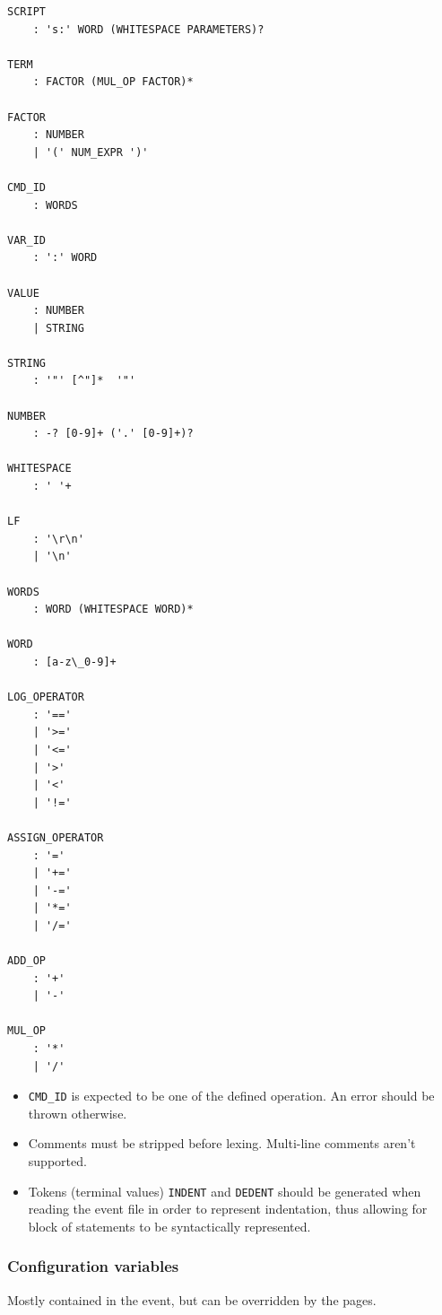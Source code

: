 \documentclass[11pt]{article}
\begin{document}
\newpage
\begin{Verbatim}[frame=single, fontsize=\footnotesize]
SCRIPT
    : 's:' WORD (WHITESPACE PARAMETERS)?

TERM
    : FACTOR (MUL_OP FACTOR)*

FACTOR
    : NUMBER
    | '(' NUM_EXPR ')'

CMD_ID
    : WORDS
    
VAR_ID
    : ':' WORD
    
VALUE
    : NUMBER
    | STRING
    
STRING
    : '"' [^"]*  '"'

NUMBER
    : -? [0-9]+ ('.' [0-9]+)?

WHITESPACE
    : ' '+

LF
    : '\r\n'
    | '\n'
    
WORDS
    : WORD (WHITESPACE WORD)*
    
WORD
    : [a-z\_0-9]+
    
LOG_OPERATOR
    : '=='
    | '>='
    | '<='
    | '>'
    | '<'
    | '!='
    
ASSIGN_OPERATOR
    : '='
    | '+='
    | '-='
    | '*='
    | '/='
    
ADD_OP
    : '+'
    | '-'
    
MUL_OP
    : '*'
    | '/'
\end{Verbatim}

\begin{itemize}
	\item \verb|CMD_ID| is expected to be one of the defined operation. An error should be thrown otherwise.
	
	\item Comments must be stripped before lexing. Multi-line comments aren't supported.
	
	\item Tokens (terminal values) \verb|INDENT| and \verb|DEDENT| should be generated when reading the event file in order to represent indentation, thus allowing for block of statements to be syntactically represented.
	
\end{itemize}

\subsubsection{Configuration variables}

Mostly contained in the event, but can be overridden by the pages.
\end{document}

